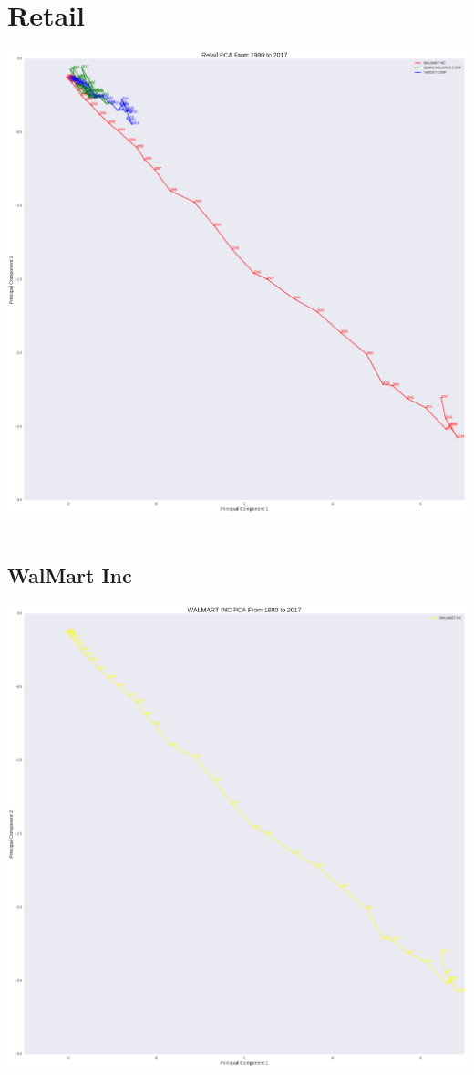 \section{Retail}
\includegraphics[width=1\textwidth]{./Retail}\\[0.1in] \\
\subsection{WalMart Inc}
\includegraphics[width=1\textwidth]{./WalMart}\\[0.1in] \\
